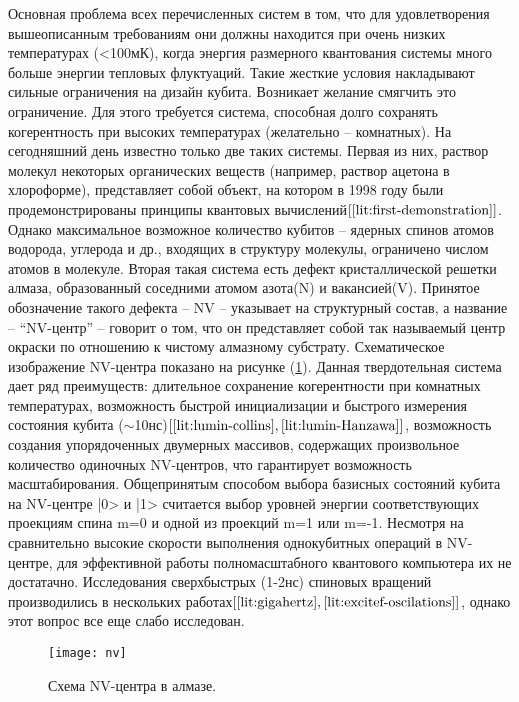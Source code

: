 Основная проблема всех перечисленных систем в том, что для
удовлетворения вышеописанным требованиям они должны находится при
очень низких температурах (<100мК), когда энергия размерного
квантования системы много больше энергии тепловых флуктуаций. Такие
жесткие условия накладывают сильные ограничения на дизайн
кубита. Возникает желание смягчить это ограничение. Для этого
требуется система, способная долго сохранять когерентность при высоких
температурах (желательно -- комнатных). На сегодняшний день известно
только две таких системы. Первая из них, раствор молекул некоторых
органических веществ (например, раствор ацетона в хлороформе),
представляет собой объект, на котором в 1998 году были
продемонстрированы принципы квантовых вычислений$[\ref{lit:first-demonstration}]$. Однако
максимальное возможное количество кубитов -- ядерных спинов атомов
водорода, углерода и др., входящих в структуру молекулы, ограничено
числом атомов в молекуле. Вторая такая система есть дефект
кристаллической решетки алмаза, образованный соседними атомом азота(N)
и вакансией(V). Принятое обозначение такого дефекта -- NV -- указывает
на структурный состав, а название -- ``NV-центр'' -- говорит о том,
что он представляет собой так называемый центр окраски по отношению к
чистому алмазному субстрату. Схематическое изображение NV-центра
показано на рисунке (\ref{fig:nv}). Данная твердотельная система дает ряд
преимуществ: длительное сохранение когерентности при комнатных
температурах, возможность быстрой инициализации и быстрого измерения
состояния кубита ($\sim$10нс)$[\ref{lit:lumin-collins}, \ref{lit:lumin-Hanzawa}]$, возможность создания упорядоченных
двумерных массивов, содержащих произвольное количество одиночных
NV-центров, что гарантирует возможность масштабирования. Общепринятым
способом выбора базисных состояний кубита на NV-центре |0> и |1> считается выбор уровней энергии
соответствующих проекциям спина m=0 и одной из проекций m=1 или m=-1. Несмотря на
сравнительно высокие скорости выполнения однокубитных операций в
NV-центре, для эффективной работы полномасштабного квантового
компьютера их не достатачно. Исследования сверхбыстрых (1-2нс) спиновых
вращений производились в нескольких работах$[\ref{lit:gigahertz}, \ref{lit:excitef-oscilations}]$, однако этот вопрос
все еще слабо исследован.
\begin{figure}[h!]\centering
  \texttt{[image: nv]}
  \caption{Схема NV-центра в алмазе.}\label{fig:nv}
\end{figure}

